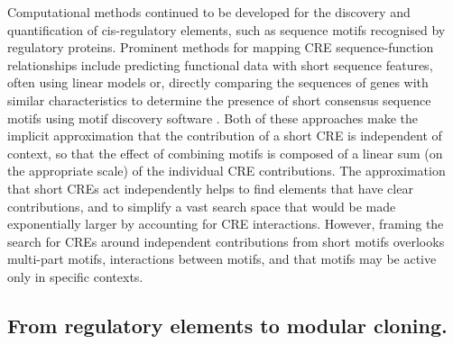 \documentclass[../main.tex]{subfiles}
\begin{document}


Computational methods continued to be developed for the discovery and quantification of cis-regulatory elements, such as sequence motifs recognised by regulatory proteins.
Prominent methods for mapping CRE sequence-function relationships include predicting functional data with short sequence features, often using linear models \parencite{Shalgi2005,Cheng2017,Vijayabaskar2019} or, directly comparing the sequences of genes with similar characteristics to determine the presence of short
consensus sequence motifs \parencite{Hogan2008,Kretz2013} using motif discovery software \parencite{Elemento2007,Bailey2015}.
Both of these approaches make the implicit approximation that the contribution of a short CRE is independent of context, so that the effect of combining motifs is composed of a linear sum (on the appropriate scale) of the individual CRE contributions.
The approximation that short CREs act independently helps to find elements that have clear contributions, and to simplify a vast search space that would be made exponentially larger by accounting for CRE interactions. 
However, framing the search for CREs around independent contributions from short motifs overlooks multi-part motifs, interactions between motifs, and that motifs may be active only in specific contexts.

\subsection{From regulatory elements to modular cloning.}
\end{document}
